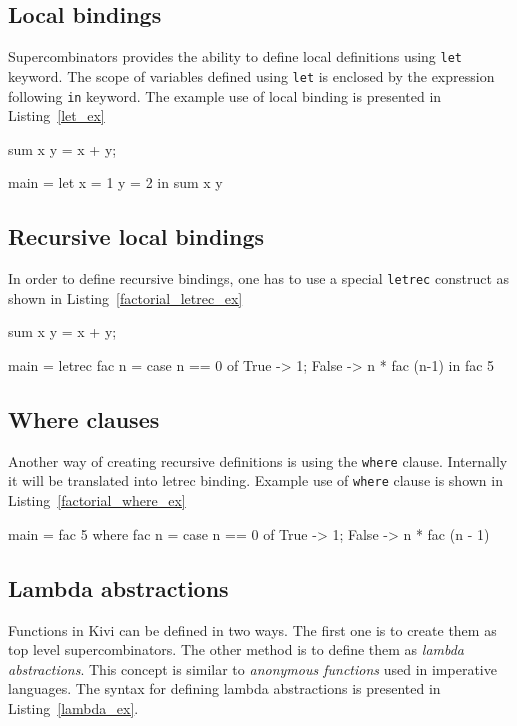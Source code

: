 \documentclass[12pt,a4paper]{report}
\begin{document}
\subsection{Local bindings}
Supercombinators provides the ability to define local definitions using
\texttt{let} keyword. The scope of variables defined using \texttt{let} is
enclosed by the expression following \texttt{in} keyword. The example use of
local binding is presented in Listing~\ref{let_ex}

\vspace*{0.2in}
\begin{code}[style=haskell,label=let_ex,caption={Local \texttt{let} binding.}]
sum x y = x + y;

main =
    let x = 1
        y = 2
    in
        sum x y
\end{code}

\subsection{Recursive local bindings}
In order to define recursive bindings, one has to use a special \texttt{letrec}
construct as shown in Listing~\ref{factorial_letrec_ex}

\vspace*{0.2in}
\begin{code}[style=haskell,label=factorial_letrec_ex,caption={Factorial function using \texttt{letrec}.}]
sum x y = x + y;

main =
    letrec fac n =
        case n == 0 of
            True  -> 1;
            False -> n * fac (n-1)
    in
        fac 5
\end{code}

\subsection{Where clauses}
Another way of creating recursive definitions is using the \texttt{where}
clause. Internally it will be translated into letrec binding. Example use of
\texttt{where} clause is shown in Listing~\ref{factorial_where_ex}

\vspace*{0.2in}
\begin{code}[style=haskell,label=factorial_where_ex,caption={Factorial function using \texttt{where}.}]
main = fac 5
    where
        fac n = case n == 0 of
            True  -> 1;
            False -> n * fac (n - 1)
\end{code}

\subsection{Lambda abstractions}
Functions in Kivi can be defined in two ways. The first one is to create them
as top level supercombinators. The other method is to define them as
\textit{lambda abstractions}. This concept is similar to \textit{anonymous
functions} used in imperative languages. The syntax for defining lambda
abstractions is presented in Listing~\ref{lambda_ex}.
\end{document}
